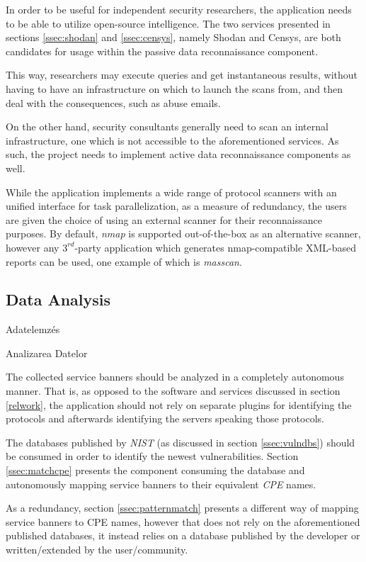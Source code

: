\documentclass[a4paper,12pt]{article}
\newcommand\subsectionhu[1]{\addcontentsline{toc.hu}{subsection} {\protect\numberline{\thesubsection} #1}}
\newcommand\subsectionro[1]{\addcontentsline{toc.ro}{subsection} {\protect\numberline{\thesubsection} #1}}
\begin{document}
	In order to be useful for independent security researchers, the application needs to be able to utilize open-source intelligence. The two services presented in sections \ref{ssec:shodan} and \ref{ssec:censys}, namely Shodan\cite{shodan16} and Censys\cite{censys15}, are both candidates for usage within the passive data reconnaissance component.
	
	This way, researchers may execute queries and get instantaneous results, without having to have an infrastructure on which to launch the scans from, and then deal with the consequences, such as abuse emails.
	
	On the other hand, security consultants generally need to scan an internal infrastructure, one which is not accessible to the aforementioned services. As such, the project needs to implement active data reconnaissance components as well.
	
	While the application implements a wide range of protocol scanners with an unified interface for task parallelization, as a measure of redundancy, the users are given the choice of using an external scanner for their reconnaissance purposes. By default, \textit{nmap} is supported out-of-the-box as an alternative scanner, however any $3^{rd}$-party application which generates nmap-compatible XML-based reports can be used, one example of which is \textit{masscan}.
		
\subsection{Data Analysis}
\subsectionhu{Adatelemzés} \subsectionro{Analizarea Datelor}
	
	The collected service banners should be analyzed in a completely autonomous manner. That is, as opposed to the software and services discussed in section \ref{relwork}, the application should not rely on separate plugins for identifying the protocols and afterwards identifying the servers speaking those protocols.
	
	The databases published by \textit{NIST} (as discussed in section \ref{ssec:vulndbs}) should be consumed in order to identify the newest vulnerabilities. Section \ref{ssec:matchcpe} presents the component consuming the database and autonomously mapping service banners to their equivalent \textit{CPE} names.
	
	As a redundancy, section \ref{ssec:patternmatch} presents a different way of mapping service banners to CPE names, however that does not rely on the aforementioned published databases, it instead relies on a database published by the developer or written/extended by the user/community.
			
\end{document}
